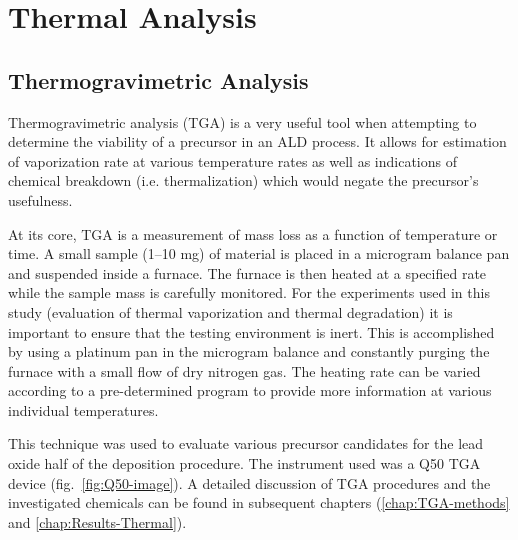 \section{Thermal Analysis}


\subsection{Thermogravimetric Analysis}

Thermogravimetric analysis (TGA) is a very useful tool when attempting to determine the viability of a precursor in an ALD process. It allows for estimation of vaporization rate at various temperature rates as well as indications of chemical breakdown (i.e. thermalization) which would negate the precursor's usefulness. 

At its core, TGA is a measurement of mass loss as a function of temperature or time. A small sample (1--10 mg) of material is placed in a microgram balance pan and suspended inside a furnace. The furnace is then heated at a specified rate while the sample mass is carefully monitored. For the experiments used in this study (evaluation of thermal vaporization and thermal degradation) it is important to ensure that the testing environment is inert. This is accomplished by using a platinum pan in the microgram balance and constantly purging the furnace with a small flow of dry nitrogen gas. The heating rate can be varied according to a pre-determined program to provide more information at various individual temperatures. 

This technique was used to evaluate various precursor candidates for the lead oxide half of the \PTO deposition procedure. The instrument used was a Q50 TGA device (fig.~\ref{fig:Q50-image}).  A detailed discussion of TGA procedures and the investigated chemicals can be found in subsequent chapters (\ref{chap:TGA-methods} and \ref{chap:Results-Thermal}). 

